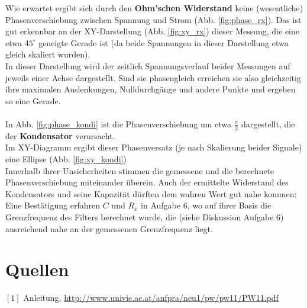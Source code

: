 \documentclass[12pt,a4paper]{article}
\begin{document}
\begin{multicols}{2}
Wie erwartet ergibt sich durch den \textbf{Ohm'schen Widerstand} keine (wesentliche) Phasenverschiebung zwischen Spannung und Strom (Abb. \ref{fig:phase_rx}). Das ist gut erkennbar an der XY-Darstellung (Abb. \ref{fig:xy_rx}) dieser Messung, die eine etwa $45^\circ$ geneigte Gerade ist (da beide Spannungen in dieser Darstellung etwa gleich skaliert wurden).\\
In dieser Darstellung wird der zeitlich Spannungsverlauf beider Messungen auf jeweils einer Achse dargestellt. Sind sie phasengleich erreichen sie also gleichzeitig ihre maximalen Auslenkungen, Nulldurchgänge und andere Punkte und ergeben so eine Gerade.\\
\\
In Abb. \ref{fig:phase_kondi} ist die Phasenverschiebung um etwa $\frac{\pi}{2}$ dargestellt, die der \textbf{Kondensator} verursacht.\\
Im XY-Diagramm ergibt dieser Phasenversatz (je nach Skalierung beider Signale) eine Ellipse (Abb. \ref{fig:xy_kondi})\\
Innerhalb ihrer Unsicherheiten stimmen die gemessene und die berechnete Phasenverschiebung miteinander überein. Auch der ermittelte Widerstand des Kondensators und seine Kapazität dürften dem wahren Wert gut nahe kommen:\\
Eine Bestätigung erfahren $C$ und $R_x$ in Aufgabe 6, wo auf ihrer Basis die Grenzfrequenz des Filters berechnet wurde, die (siehe Diskussion Aufgabe 6) ausreichend nahe an der gemessenen Grenzfrequenz liegt.



\section{Quellen}
$[1]$ Anleitung, \url{http://www.univie.ac.at/anfpra/neu1/pw/pw11/PW11.pdf}\\
\end{multicols}
\end{document}
